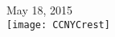 \documentclass[12pt,letterpaper,notitlepage]{article}
\begin{document}
\begin{titlepage}



{\large May 18, 2015}\\[2cm] %


\texttt{[image: CCNYCrest]}\\[1cm] %

\vfill %

\end{titlepage}
\tableofcontents
\end{document}
